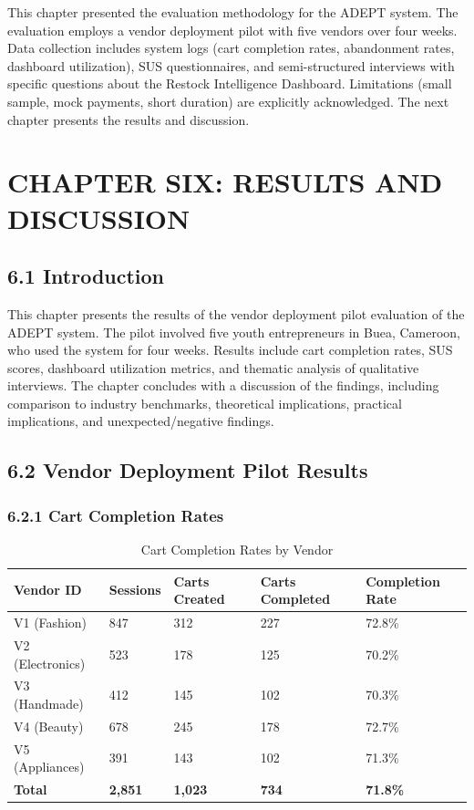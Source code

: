 \documentclass[12pt,a4paper]{article}
\begin{document}
This chapter presented the evaluation methodology for the ADEPT system. The evaluation employs a vendor deployment pilot with five vendors over four weeks. Data collection includes system logs (cart completion rates, abandonment rates, dashboard utilization), SUS questionnaires, and semi-structured interviews with specific questions about the Restock Intelligence Dashboard. Limitations (small sample, mock payments, short duration) are explicitly acknowledged. The next chapter presents the results and discussion.

\newpage

\section{CHAPTER SIX: RESULTS AND DISCUSSION}

\subsection{6.1 Introduction}

This chapter presents the results of the vendor deployment pilot evaluation of the ADEPT system. The pilot involved five youth entrepreneurs in Buea, Cameroon, who used the system for four weeks. Results include cart completion rates, SUS scores, dashboard utilization metrics, and thematic analysis of qualitative interviews. The chapter concludes with a discussion of the findings, including comparison to industry benchmarks, theoretical implications, practical implications, and unexpected/negative findings.

\subsection{6.2 Vendor Deployment Pilot Results}

\subsubsection{6.2.1 Cart Completion Rates}

\begin{table}[h]
\centering
\caption{Cart Completion Rates by Vendor}
\label{tab:completion_rates}
\begin{tabular}{p{3cm}p{3cm}p{3cm}p{3cm}p{3cm}}
\toprule
\textbf{Vendor ID} & \textbf{Sessions} & \textbf{Carts Created} & \textbf{Carts Completed} & \textbf{Completion Rate} \\
\midrule
V1 (Fashion) & 847 & 312 & 227 & 72.8\% \\
V2 (Electronics) & 523 & 178 & 125 & 70.2\% \\
V3 (Handmade) & 412 & 145 & 102 & 70.3\% \\
V4 (Beauty) & 678 & 245 & 178 & 72.7\% \\
V5 (Appliances) & 391 & 143 & 102 & 71.3\% \\
\hline
\textbf{Total} & \textbf{2,851} & \textbf{1,023} & \textbf{734} & \textbf{71.8\%} \\
\bottomrule
\end{tabular}
\end{table}
\end{document}
